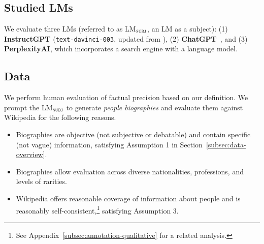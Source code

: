 \documentclass[11pt]{article}
\makeatletter
\newcommand\footnoteref[1]{\protected@xdef\@thefnmark{\ref{#1}}\@footnotemark}
\newcommand{\subjectLM}{LM$_\textsc{subj}$}
\newcommand{\pw}[1]{%
}
\makeatother
\begin{document}
\subsection{Studied LMs}
We evaluate three LMs (referred to as \subjectLM{}, %
an LM as a subject):
(1) \textbf{InstructGPT} (\texttt{text-davinci-003}, updated from \citet{ouyang2022training}),
(2) \textbf{ChatGPT}~\citep{chatgpt}, %
and (3) \textbf{PerplexityAI},\footnoteref{fn:ppl} which incorporates a search engine with a language model. %

\subsection{Data}
\label{subsec:data}


We perform human evaluation of factual precision based on our definition. We prompt the \subjectLM{} to generate {\em people biographies} and evaluate them against Wikipedia for the following reasons.
\vspace{-.3em}
\begin{itemize}[leftmargin=15pt]\itemsep -.2em
    \item Biographies are objective (not subjective or debatable) and contain specific (not vague) information, satisfying Assumption 1 in Section~\ref{subsec:data-overview}. %
    \item Biographies allow evaluation across diverse nationalities, professions, and levels of rarities.
    \item Wikipedia offers reasonable coverage of information about people and is reasonably self-consistent,\footnote{See Appendix~\ref{subsec:annotation-qualitative} for a related analysis.} satisfying Assumption 3. %
\end{itemize}
\end{document}

